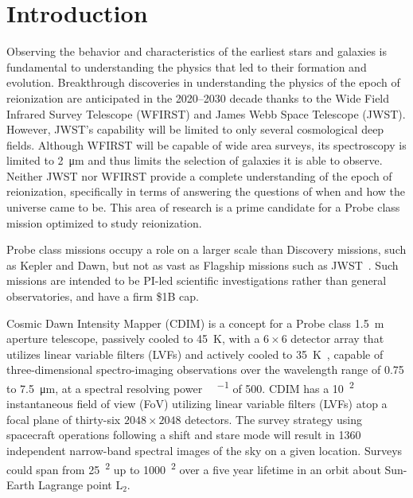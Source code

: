\documentclass{ws-jai}
\begin{document}
\section{Introduction}
\label{sec:introduction}
Observing the behavior and characteristics of the earliest stars and galaxies is fundamental to understanding the physics that led to their formation and evolution.
Breakthrough discoveries in understanding the physics of the epoch of reionization are anticipated in the 2020--2030 decade thanks to the Wide Field Infrared Survey Telescope (WFIRST) and James Webb Space Telescope (JWST).
However, JWST's capability will be limited to {\color{red}only several} cosmological deep fields.
Although WFIRST will be capable of wide area surveys, its spectroscopy is limited to \SI{2}{\micro\meter} and thus limits the selection of galaxies it is able to observe.
Neither JWST nor WFIRST provide a complete understanding of the epoch of reionization, specifically in terms of answering the questions of when and how the universe came to be.
This area of research is a prime candidate for a Probe class mission optimized to study reionization.


Probe class missions occupy a role on a larger scale than Discovery missions, such as Kepler and Dawn, but not as vast as Flagship missions such as JWST~\cite{probeclasswp}.
Such missions are intended to be PI-led scientific investigations rather than general observatories, and have a firm \$1B cap.

Cosmic Dawn Intensity Mapper (CDIM) is a concept for a Probe class \SI{1.5}{\meter} aperture telescope, passively cooled to \SI{45}{\kelvin}, with a $6\times6$ detector array that utilizes linear variable filters (LVFs) and actively cooled to \SI{35}{\kelvin}~\cite{cooray2016cdim2page}, capable of three-dimensional spectro-imaging observations over the wavelength range of 0.75 to \SI{7.5}{\micro\meter}, at a spectral resolving power \si{\Delta\lambda\per\lambda} of 500.
CDIM has a \SI{10}{\deg\squared} instantaneous field of view (FoV) utilizing linear variable filters (LVFs) atop a focal plane of thirty-six $2048\times2048$ detectors.
The survey strategy using spacecraft operations following a shift and stare mode will result in 1360 independent narrow-band spectral images of the sky on a given location.
Surveys could span from \SI{25}{\deg\squared} up to \SI{1000}{\deg\squared} over a five year lifetime in an orbit about Sun-Earth Lagrange point L$_{2}$\@.
\end{document}
